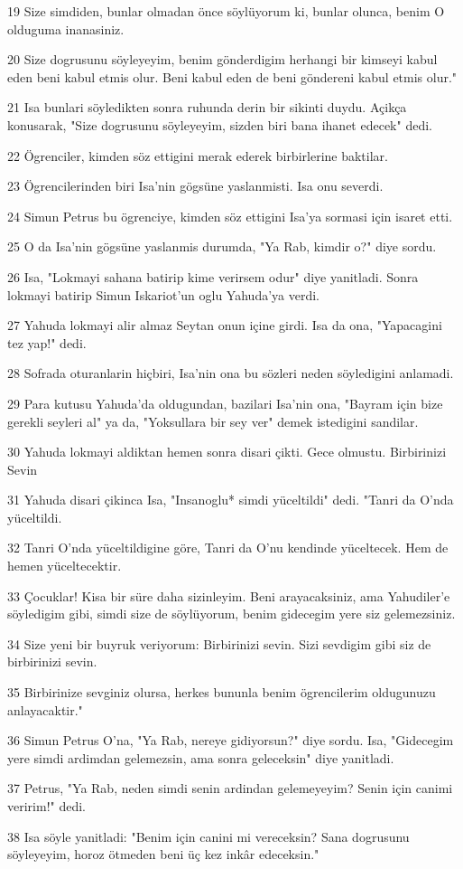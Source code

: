 \par 19 Size simdiden, bunlar olmadan önce söylüyorum ki, bunlar olunca, benim O olduguma inanasiniz.
\par 20 Size dogrusunu söyleyeyim, benim gönderdigim herhangi bir kimseyi kabul eden beni kabul etmis olur. Beni kabul eden de beni göndereni kabul etmis olur."
\par 21 Isa bunlari söyledikten sonra ruhunda derin bir sikinti duydu. Açikça konusarak, "Size dogrusunu söyleyeyim, sizden biri bana ihanet edecek" dedi.
\par 22 Ögrenciler, kimden söz ettigini merak ederek birbirlerine baktilar.
\par 23 Ögrencilerinden biri Isa'nin gögsüne yaslanmisti. Isa onu severdi.
\par 24 Simun Petrus bu ögrenciye, kimden söz ettigini Isa'ya sormasi için isaret etti.
\par 25 O da Isa'nin gögsüne yaslanmis durumda, "Ya Rab, kimdir o?" diye sordu.
\par 26 Isa, "Lokmayi sahana batirip kime verirsem odur" diye yanitladi. Sonra lokmayi batirip Simun Iskariot'un oglu Yahuda'ya verdi.
\par 27 Yahuda lokmayi alir almaz Seytan onun içine girdi. Isa da ona, "Yapacagini tez yap!" dedi.
\par 28 Sofrada oturanlarin hiçbiri, Isa'nin ona bu sözleri neden söyledigini anlamadi.
\par 29 Para kutusu Yahuda'da oldugundan, bazilari Isa'nin ona, "Bayram için bize gerekli seyleri al" ya da, "Yoksullara bir sey ver" demek istedigini sandilar.
\par 30 Yahuda lokmayi aldiktan hemen sonra disari çikti. Gece olmustu. Birbirinizi Sevin
\par 31 Yahuda disari çikinca Isa, "Insanoglu* simdi yüceltildi" dedi. "Tanri da O'nda yüceltildi.
\par 32 Tanri O'nda yüceltildigine göre, Tanri da O'nu kendinde yüceltecek. Hem de hemen yüceltecektir.
\par 33 Çocuklar! Kisa bir süre daha sizinleyim. Beni arayacaksiniz, ama Yahudiler'e söyledigim gibi, simdi size de söylüyorum, benim gidecegim yere siz gelemezsiniz.
\par 34 Size yeni bir buyruk veriyorum: Birbirinizi sevin. Sizi sevdigim gibi siz de birbirinizi sevin.
\par 35 Birbirinize sevginiz olursa, herkes bununla benim ögrencilerim oldugunuzu anlayacaktir."
\par 36 Simun Petrus O'na, "Ya Rab, nereye gidiyorsun?" diye sordu. Isa, "Gidecegim yere simdi ardimdan gelemezsin, ama sonra geleceksin" diye yanitladi.
\par 37 Petrus, "Ya Rab, neden simdi senin ardindan gelemeyeyim? Senin için canimi veririm!" dedi.
\par 38 Isa söyle yanitladi: "Benim için canini mi vereceksin? Sana dogrusunu söyleyeyim, horoz ötmeden beni üç kez inkâr edeceksin."

